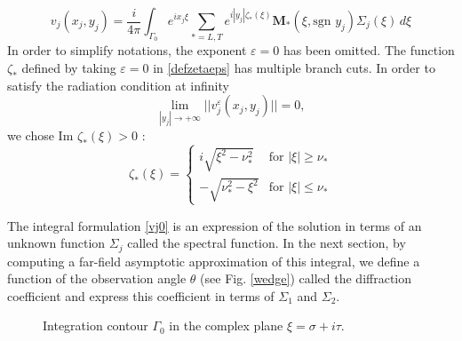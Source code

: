 \begin{equation}
v_j(x_j,y_j)=\frac{i}{4\pi}\int_{\Gamma_0} e^{ix_j\xi}\sum_{*=L,T}e^{i|y_j|\zeta_*(\xi)}\mathbf{M_*}(\xi,\mbox{sgn }y_j)\Sigma_j(\xi)\,d\xi
\label{vj0}
\end{equation}
In order to simplify notations, the exponent $\varepsilon=0$ has been omitted.
The function $\zeta_*$ defined by taking $\varepsilon=0$ in \eqref{defzetaeps} has multiple branch cuts. In order to satisfy the radiation condition at infinity
\begin{equation}
\lim\limits_{|y_j| \rightarrow +\infty} ||v_j^{\varepsilon}(x_j,y_j)||=0,
\label{CR}
\end{equation}
we chose Im $\zeta_*(\xi)>0$ :
\begin{equation}
\zeta_*(\xi)=
\left\{
\begin{matrix}
i\sqrt{\xi^2-\nu_*^2}& \mbox{for } |\xi| \geq \nu_* \\
-\sqrt{\nu_*^2-\xi^2}& \mbox{for } |\xi| \leq \nu_*
\end{matrix}
\right.
\label{C3:defzeta}
\end{equation}

The integral formulation \eqref{vj0} is an expression of the solution in terms of an unknown function $\Sigma_j$ called the spectral function. In the next section, by computing a far-field asymptotic approximation of this integral, we define a function of the observation angle $\theta$ (see Fig. \ref{wedge}) called the diffraction coefficient and express this coefficient in terms of $\Sigma_1$ and $\Sigma_2$.

\begin{figure}[h]
\centering
{}
\caption{Integration contour $\Gamma_0$ in the complex plane $\xi=\sigma+i\tau$.}
\label{gamma0}
\end{figure}

